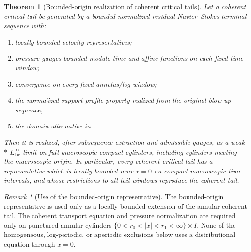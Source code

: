 \documentclass[11pt]{amsart}
\numberwithin{equation}{section}
\theoremstyle{plain}
\newtheorem{theorem}{Theorem}[section]
\theoremstyle{definition}
\theoremstyle{remark}
\newtheorem{remark}[remark]{Remark}
\newcommand{\loc}{\mathrm{loc}}
\begin{document}
\begin{theorem}[Bounded-origin realization of coherent critical tails]
\label{thm:bounded-origin-realization-coherent-tails}
Let a coherent critical tail be generated by a bounded normalized residual
Navier--Stokes terminal sequence with:
\begin{enumerate}[label=\textup{(\roman*)}]
   \item locally bounded velocity representatives;
   \item pressure gauges bounded modulo time and affine functions on each fixed
   time window;
   \item convergence on every fixed annulus/log-window;
   \item the normalized support-profile property realized from the original blow-up sequence;
   \item the domain alternative in
   .
\end{enumerate}
Then it is realized, after subsequence extraction and admissible gauges, as a
weak-\(*\) \(L^\infty_{\loc}\) limit on full macroscopic compact cylinders,
including cylinders meeting the macroscopic origin.  In particular, every
coherent critical tail has a representative which is locally bounded near
\(x=0\) on compact macroscopic time intervals, and whose restrictions to all
tail windows reproduce the coherent tail.
\end{theorem}

\begin{remark}[Use of the bounded-origin representative]
\label{rem:bounded-origin-used-only-as-extension}
The bounded-origin representative is used only as a locally bounded extension
of the annular coherent tail.  The coherent transport equation and pressure
normalization are required only on punctured annular cylinders
\(\{0<r_0<|x|<r_1<\infty\}\times I\).  None of the homogeneous,
log-periodic, or aperiodic exclusions below uses a distributional equation
through \(x=0\).
\end{remark}
\end{document}
